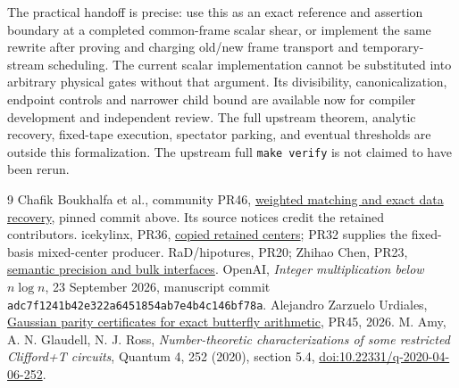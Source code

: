 \documentclass[11pt,a4paper]{article}
\begin{document}
The practical handoff is precise: use this as an exact reference and
assertion boundary at a completed common-frame scalar shear, or implement
the same rewrite after proving and charging old/new frame transport and
temporary-stream scheduling. The current scalar implementation cannot be
substituted into arbitrary physical gates without that argument. Its
divisibility, canonicalization, endpoint controls and narrower child bound
are available now for compiler development and independent review.
The full upstream theorem, analytic recovery, fixed-tape execution,
spectator parking, and eventual thresholds are outside this formalization.
The upstream full \texttt{make verify} is not claimed to have been rerun.

\begin{thebibliography}{9}\small
{} Chafik Boukhalfa et al., community PR46,
\href{https://github.com/CrocSwap/integer-mult-bounds/pull/46}{weighted matching and exact data recovery},
pinned commit above. Its source notices credit the retained contributors.
 icekylinx, PR36,
\href{https://github.com/CrocSwap/integer-mult-bounds/pull/36}{copied retained centers};
PR32 supplies the fixed-basis mixed-center producer.
 RaD/hipotures, PR20; Zhihao Chen, PR23,
\href{https://github.com/CrocSwap/integer-mult-bounds/pull/23}{semantic precision and bulk interfaces}.
 OpenAI, \emph{Integer multiplication below $n\log n$},
23 September 2026, manuscript commit
\texttt{adc7f1241b42e322a6451854ab7e4b4c146bf78a}.
 Alejandro Zarzuelo Urdiales,
\href{https://github.com/CrocSwap/integer-mult-bounds/pull/45}{Gaussian parity certificates for exact butterfly arithmetic}, PR45, 2026.
 M. Amy, A. N. Glaudell, N. J. Ross,
\emph{Number-theoretic characterizations of some restricted Clifford+T circuits},
Quantum 4, 252 (2020), section 5.4,
\href{https://doi.org/10.22331/q-2020-04-06-252}{doi:10.22331/q-2020-04-06-252}.
\end{thebibliography}
\end{document}

